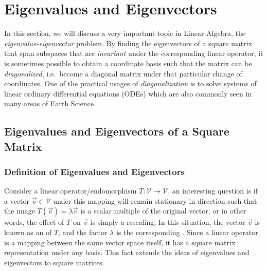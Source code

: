 \chapter{Eigenvalues and Eigenvectors}
\label{chap:eigen}

In this section, we will discuss a very important topic in Linear Algebra, the \textit{eigenvalue-eigenvector} problem. By finding the eigenvectors of a square matrix that span subspaces that are \textit{invariant} under the corresponding linear operator, it is sometimes possible to obtain a coordinate basis such that the matrix can be \textit{diagonalized}, i.e.\ become a diagonal matrix under that particular change of coordinates. One of the practical usages of \textit{diagonalization} is to solve systems of linear ordinary differential equations (ODEs) which are also commonly seen in many areas of Earth Science.

\section{Eigenvalues and Eigenvectors of a Square Matrix}
\label{section:eigensection}

\subsection{Definition of Eigenvalues and Eigenvectors}

Consider a linear operator/endomorphism $T: \mathcal{V} \to \mathcal{V}$, an interesting question is if a vector $\vec{v} \in \mathcal{V}$ under this mapping will remain stationary in direction such that the image $T(\vec{v}) = \lambda \vec{v}$ is a scalar multiple of the original vector, or in other words, the effect of $T$ on $\vec{v}$ is simply a rescaling. In this situation, the vector $\vec{v}$ is known as an  of $T$, and the factor $\lambda$ is the corresponding . Since a linear operator is a mapping between the same vector space itself, it has a square matrix representation under any basis. This fact extends the ideas of eigenvalues and eigenvectors to square matrices.

